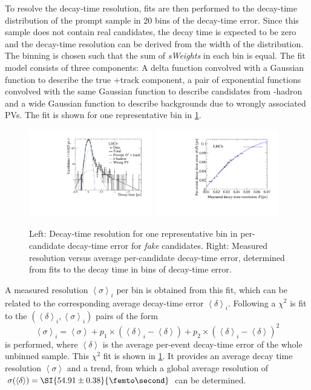 To resolve the decay-time resolution, fits are then performed to the decay-time distribution of the prompt sample in \num{20} bins of the decay-time error.
Since this sample does not contain real \Bz candidates, the decay time is expected to be zero and the decay-time resolution can be derived from the width of the distribution.
The binning is chosen such that the sum of \emph{sWeights} in each bin is equal.
The fit model consists of three components: A delta function convolved with a Gaussian function to describe the true \Dpm+track component, a pair of exponential functions convolved with the same Gaussian function to describe candidates from \bquark-hadron and a wide Gaussian function to describe backgrounds due to wrongly associated \ac{PV}s.
The fit is shown for one representative bin in \cref{fig:resolutionRepresentativeBin}.
\begin{figure}[tbp]
    \centering
    \includegraphics[width=0.48\textwidth]{09TimeFit/figs/resolution_Bin15.pdf}
    \includegraphics[width=0.48\textwidth]{09TimeFit/figs/resolution_chi2Fit.pdf}
    \caption{Left: Decay-time resolution for one representative bin in per-candidate decay-time error for \emph{fake} \Bz candidates.
    Right: Measured resolution versus average per-candidate decay-time error, determined from fits to the decay time in bins of decay-time error.}
    \label{fig:resolutionRepresentativeBin}
\end{figure}
A measured resolution $\left<\sigma\right>_i$ per bin is obtained from this fit, which can be related to the corresponding average decay-time error $\left<\delta\right>_i$.
Following a $\chi^2$ is fit to the $(\left<\delta\right>_i, \left<\sigma\right>_i)$ pairs of the form
\begin{equation}
\left<\sigma\right>_i=\left<\sigma\right>+p_1\times\left(\left<\delta\right>_i-\left<\delta\right>\right)+p_2\times\left(\left<\delta\right>_i-\left<\delta\right>\right)^2
\end{equation}
is performed, where $\left<\delta\right>$ is the average per-event decay-time error of the whole unbinned sample.
This $\chi^2$ fit is shown in \cref{fig:resolutionRepresentativeBin}.
It provides an average decay time resolution $\left<\sigma\right>$ and a trend, from which a global average resolution of \mbox{$\sigma\!\left(\left<\delta\right>\right)=\SI{54.91\pm0.38}{\femto\second}$} can be determined.

